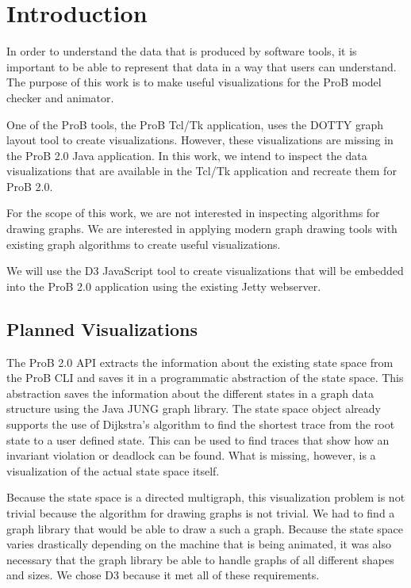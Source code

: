 \section{Introduction}

In order to understand the data that is produced by software tools, it is important to be able to represent that data in a way that users can understand. The purpose of this work is to make useful visualizations for the ProB model checker and animator. 

One of the ProB tools, the ProB Tcl/Tk application, uses the DOTTY graph layout tool to create visualizations. However, these visualizations are missing in the ProB 2.0 Java application. In this work, we intend to inspect the data visualizations that are available in the Tcl/Tk application and recreate them for ProB 2.0. 

For the scope of this work, we are not interested in inspecting algorithms for drawing graphs. We are interested in applying modern graph drawing tools with existing graph algorithms to create useful visualizations.

We will use the D3 JavaScript tool to create visualizations that will be embedded into the ProB 2.0 application using the existing Jetty webserver.


\subsection{Planned Visualizations}

The ProB 2.0 API extracts the information about the existing state space from the ProB CLI and saves it in a programmatic abstraction of the state space. This abstraction saves the information about the different states in a graph data structure using the Java JUNG graph library. The state space object already supports the use of Dijkstra's algorithm to find the shortest trace from the root state to a user defined state. This can be used to find traces that show how an invariant violation or deadlock can be found. What is missing, however, is a visualization of the actual state space itself.

Because the state space is a directed multigraph, this visualization problem is not trivial because the algorithm for drawing graphs is not trivial. We had to find a graph library that would be able to draw a such a graph. Because the state space varies drastically depending on the machine that is being animated, it was also necessary that the graph library be able to handle graphs of all different shapes and sizes. We chose D3 because it met all of these requirements.

